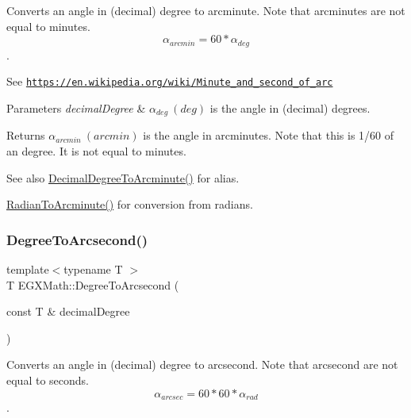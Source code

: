 Converts an angle in (decimal) degree to arcminute. Note that arcminutes are not equal to minutes. \[\alpha_{arcmin}= 60 * \alpha_{deg}\]. 

See \href{https://en.wikipedia.org/wiki/Minute_and_second_of_arc}{\tt https\+://en.\+wikipedia.\+org/wiki/\+Minute\+\_\+and\+\_\+second\+\_\+of\+\_\+arc} 
\begin{DoxyParams}{Parameters}
{\em decimal\+Degree} & $\alpha_{deg}\ (deg)$ is the angle in (decimal) degrees. \\
\hline
\end{DoxyParams}
\begin{DoxyReturn}{Returns}
$\alpha_{arcmin}\ (arcmin)$ is the angle in arcminutes. Note that this is 1/60 of an degree. It is not equal to minutes. 
\end{DoxyReturn}
\begin{DoxySeeAlso}{See also}
\mbox{\hyperlink{group___e_g_x_math-_angle_conversions-_decimal_degree_ga6b6ea6e45d2a13f556824ca419cc9fbd}{Decimal\+Degree\+To\+Arcminute()}} for alias. 

\mbox{\hyperlink{group___e_g_x_math-_angle_conversions-_radian_ga722e3b8e78540a6b3942b73b64aeb8d2}{Radian\+To\+Arcminute()}} for conversion from radians. 
\end{DoxySeeAlso}
\mbox{\label{group___e_g_x_math-_angle_conversions-_degree_gaf85e2d765c248f447854a807a68a5de8}} 
\subsubsection{\texorpdfstring{Degree\+To\+Arcsecond()}{DegreeToArcsecond()}}
{\footnotesize\ttfamily template$<$typename T $>$ \\
T E\+G\+X\+Math\+::\+Degree\+To\+Arcsecond (\begin{DoxyParamCaption}\item[{const T \&}]{decimal\+Degree }\end{DoxyParamCaption})}



Converts an angle in (decimal) degree to arcsecond. Note that arcsecond are not equal to seconds. \[\alpha_{arcsec}=60 * 60 * \alpha_{rad}\]. 

